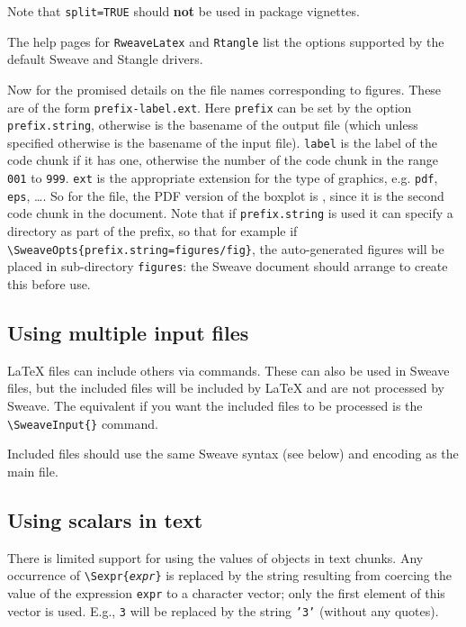 \documentclass[a4paper]{article}
\begin{document}
Note that \texttt{split=TRUE} should \textbf{not} be used in package
vignettes.

The help pages for \texttt{RweaveLatex} and \texttt{Rtangle} list the
options supported by the default Sweave and Stangle drivers.

Now for the promised details on the file names corresponding to
figures.  These are of the form \texttt{prefix-label.ext}.  Here
\texttt{prefix} can be set by the option \texttt{prefix.string},
otherwise is the basename of the output file (which unless specified
otherwise is the basename of the input file).  \texttt{label} is the
label of the code chunk if it has one, otherwise the number of the
code chunk in the range \texttt{001} to \texttt{999}.  \texttt{ext} is
the appropriate extension for the type of graphics, e.g.{}
\texttt{pdf}, \texttt{eps}, \ldots{}.  So for the
 file, the PDF version of the boxplot is
, since it is the second code chunk in the
document.  Note that if \texttt{prefix.string} is used it can specify
a directory as part of the prefix, so that for example if
\verb|\SweaveOpts{prefix.string=figures/fig}|, the auto-generated
figures will be placed in sub-directory \verb|figures|: the Sweave
document should arrange to create this before use.

\subsection{Using multiple input files}

\LaTeX{} files can include others via \verb|| commands.  These
can also be used in Sweave files, but the included files will be
included by \LaTeX{} and are not processed by Sweave.  The equivalent
if you want the included files to be processed is the
\verb|\SweaveInput{}| command.

Included files should use the same Sweave syntax (see below) and
encoding as the main file.


\subsection{Using scalars in text}

There is limited support for using the values of \R{} objects in text
chunks. Any occurrence of \verb|\Sexpr|\verb|{|\texttt{\textit{expr}}\verb|}|
is replaced by the string resulting from coercing the value of the
expression \texttt{expr} to a character vector; only the first element
of this vector is used. E.g., \verb|3| will be replaced
by the string \texttt{'3'} (without any quotes).
\end{document}
